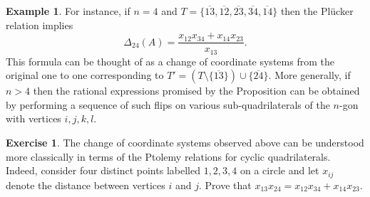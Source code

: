 \documentclass{amsart}
\theoremstyle{definition}
\newtheorem{example}[theorem]{Example}
\newtheorem{subexercise}{Exercise}[theorem]
\theoremstyle{remark}
\numberwithin{equation}{section}
\begin{document}
\begin{example}
		For instance, if $n=4$ and $T = \{\overline{13},\overline{12},\overline{23},\overline{34},\overline{14}\}$ then the Pl\"ucker relation implies
		\begin{displaymath}
		\Delta_{24}(A) = \frac{x_{12}x_{34} + x_{14}x_{23}}{x_{13}}.
		\end{displaymath}
		This formula can be thought of as a change of coordinate systems from the original one to one corresponding to $T' = (T \setminus \{\overline{13}\}) \cup \{\overline{24}\}$.  More generally, if $n>4$ then the rational expressions promised by the Proposition can be obtained by performing a sequence of such flips on various sub-quadrilaterals of the $n$-gon with vertices $i,j,k,l$.
    \setcounter{subexercise}{2}
    \begin{subexercise}
      The change of coordinate systems observed above can be understood more classically in terms of the Ptolemy relations for cyclic quadrilaterals.  Indeed, consider four distinct points labelled $1,2,3,4$ on a circle and let $x_{ij}$ denote the distance between vertices $i$ and $j$.  Prove that $x_{13}x_{24}=x_{12}x_{34}+x_{14}x_{23}$.
    \end{subexercise}
  \end{example}
  
\end{document}
